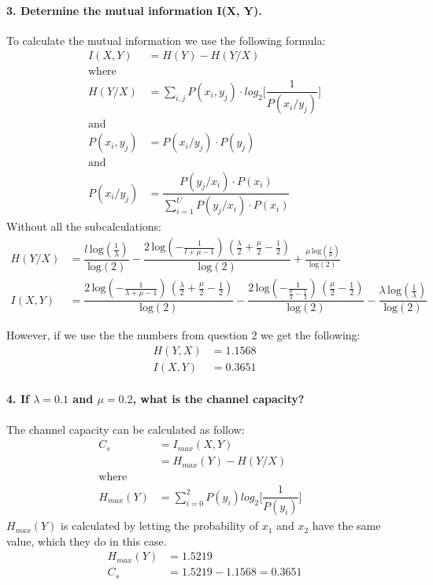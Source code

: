 \documentclass[Main]{subfiles}
\begin{document}
\paragraph{3. Determine the mutual information I(X, Y).}
To calculate the mutual information we use the following formula:
\begin{align*}
I(X,Y) &= H(Y) - H(Y/X)\\
\text{where}\\
H(Y/X) &= \sum_{i,j} P(x_i, y_j) \cdot log_2\bigg[\dfrac{1}{P(x_i/y_j)}\bigg]\\
\text{and}\\
P(x_i, y_j) &= P(x_i/y_j) \cdot P(y_j)\\
\text{and}\\
P(x_i/y_j) &= \dfrac{P(y_j/x_i)\cdot P(x_i)}{\sum_{i=1}^U P(y_j/x_i)\cdot P(x_i)}
\end{align*}
Without all the subcalculations:
\begin{align*}
H(Y/X) &= \dfrac{l\, \mathrm{log}\!\left(\frac{1}{\lambda}\right)}{\mathrm{log}\!\left(2\right)} - \dfrac{2\, \mathrm{log}\!\left(-\frac{1}{l + \mu - 1}\right)\, \left(\frac{\lambda}{2} + \frac{\mu}{2} - \frac{1}{2}\right)}{\mathrm{log}\!\left(2\right)} + \frac{\mu\, \mathrm{log}\!\left(\frac{1}{\mu}\right)}{\mathrm{log}\!\left(2\right)}
\\
I(X,Y) &= \dfrac{2\, \mathrm{log}\!\left(-\frac{1}{\lambda + \mu - 1}\right)\, \left(\frac{\lambda}{2} + \frac{\mu}{2} - \frac{1}{2}\right)}{\mathrm{log}\!\left(2\right)} - \dfrac{2\, \mathrm{log}\!\left(-\frac{1}{\frac{\mu}{2} - \frac{1}{2}}\right)\, \left(\frac{\mu}{2} - \frac{1}{2}\right)}{\mathrm{log}\!\left(2\right)} - \dfrac{\lambda\, \mathrm{log}\!\left(\frac{1}{\lambda}\right)}{\mathrm{log}\!\left(2\right)}
\end{align*}

However, if we use the the numbers from question 2 we get the following:
\begin{align*}
H(Y,X) &= 1.1568\\
I(X,Y) &=0.3651
\end{align*}

\paragraph{4. If $\lambda = 0.1$ and $\mu = 0.2$, what is the channel capacity?}

The channel capacity can be calculated as follow:
\begin{align*}
C_s &= I_{max}(X,Y) & \\
	&= H_{max}(Y) - H(Y/X)\\
	\text{where}\\
H_{max}(Y) &= \sum_{i=0}^2 P(y_i)log_2\bigg[\dfrac{1}{P(y_i)}\bigg]
\end{align*}
$H_{max}(Y)$ is calculated by letting the probability of $x_1$ and $x_2$ have the same value, which they do in this case.
\begin{align*}
H_{max}(Y) &= 1.5219\\
C_s &= 1.5219 - 1.1568 = 0.3651
\end{align*}
\end{document}
